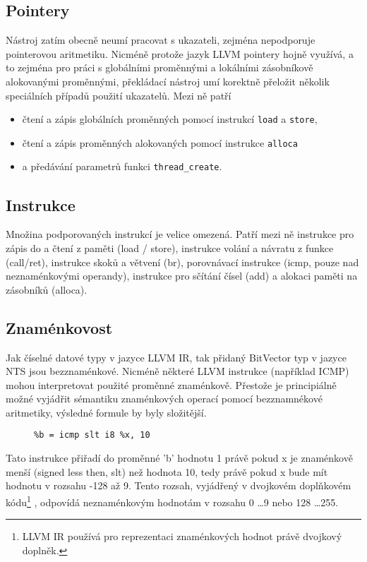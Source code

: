 \documentclass[12pt]{fithesis2}
\begin{document}
\subsection{Pointery}
Nástroj zatím obecně neumí pracovat s ukazateli, zejména nepodporuje pointerovou aritmetiku. Nicméně protože jazyk LLVM pointery hojně využívá, a to zejména pro práci s globálními proměnnými a lokálními zásobníkově alokovanými proměnnými, překládací nástroj umí korektně přeložit několik speciálních případů použití ukazatelů. Mezi ně patří
\begin{itemize}
\item čtení a zápis globálních proměnných pomocí instrukcí \texttt{load} a \texttt{store},
\item čtení a zápis proměnných alokovaných pomocí instrukce \texttt{alloca}
\item a předávání parametrů funkci \texttt{thread\_create}.
\end{itemize}

\subsection{Instrukce}
Množina podporovaných instrukcí je velice omezená. Patří mezi ně instrukce pro zápis do a čtení z paměti (load / store), instrukce volání a návratu z funkce (call/ret), instrukce skoků a větvení (br), porovnávací instrukce (icmp, pouze nad neznaménkovými operandy), instrukce pro sčítání čísel (add) a alokaci paměti na zásobníků (alloca).

\subsection{Znaménkovost}
Jak číselné datové typy v jazyce LLVM IR, tak přidaný BitVector typ v jazyce NTS jsou bezznaménkové. Nicméně některé LLVM instrukce (například ICMP) mohou interpretovat použité proměnné znaménkově. Přestože je principiálně možné vyjádřit sémantiku znaménkových operací pomocí bezznamnékové aritmetiky, výsledné formule by byly složitější.
\begin{figure}[h!]
\begin{lstlisting}
%b = icmp slt i8 %x, 10
\end{lstlisting}
\end{figure}
Tato instrukce přiřadí do proměnné 'b' hodnotu 1 právě pokud x je znaménkově menší (signed less then, slt) než hodnota 10, tedy právě pokud x bude mít hodnotu v rozsahu -128 až 9. Tento rozsah, vyjádřený v dvojkovém doplňkovém kódu\footnote{LLVM IR používá pro reprezentaci znaménkových hodnot právě dvojkový doplněk.} , odpovídá neznaménkovým hodnotám v rozsahu 0 \ldots 9 nebo 128 \ldots 255. 
\end{document}
